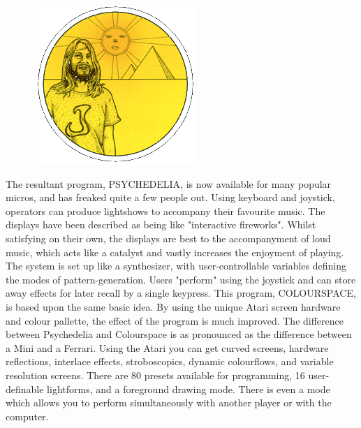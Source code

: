 \clearpage
\begin{definition}
\setlength{\intextsep}{0pt}%
\setlength{\columnsep}{3pt}%
\begin{figure}
\includegraphics[width=\linewidth]{src/callout/psych.png} 
\end{figure}
\small
The resultant program, PSYCHEDELIA, is now available for many popular micros,
and has freaked quite a few people out.  Using keyboard and joystick, operators
can produce lightshows to accompany their favourite music.  The displays have
been described as being like "interactive fireworks".  Whilst satisfying on
their own, the displays are best to the accompanyment of loud music, which acts
like a catalyst and vastly increases the enjoyment of playing.  The system is
set up like a synthesizer, with user-controllable variables defining the modes
of pattern-generation.  Users "perform" using the joystick and can store away
effects for later recall by a single keypress.
This program, COLOURSPACE, is based upon the same basic idea.  By using the
unique Atari screen hardware and colour pallette, the effect of the program is
much improved.  The difference between Psychedelia and Colourspace is as
pronounced as the difference between a Mini and a Ferrari.  Using the Atari you
can get curved screens, hardware reflections, interlace effects, stroboscopics,
dynamic colourflows, and variable resolution screens.  There are 80 presets
available for programming, 16 user-definable lightforms, and a foreground
drawing mode.  There is even a mode which allows you to perform simultaneously
with another player or with the computer.
\end{definition}


